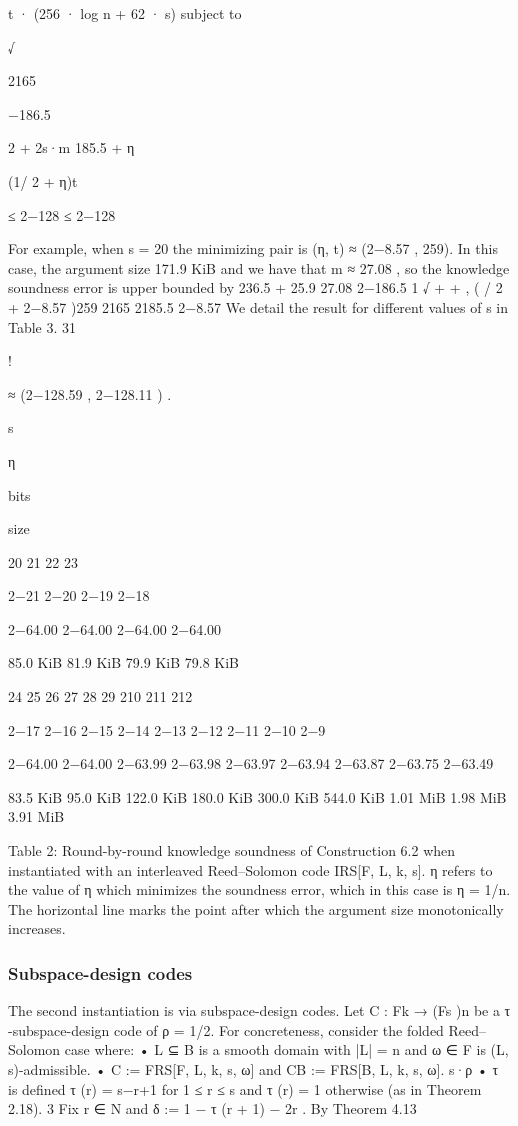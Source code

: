 \documentclass[11pt]{article}
\begin{document}
t · (256 · log n + 62 · s) subject to

√

2165

−186.5

2
+ 2s·m
185.5 +
η

(1/ 2 + η)t

≤ 2−128
≤ 2−128

For example, when s = 20 the minimizing pair is (η, t) ≈ (2−8.57 , 259). In this case, the argument
size 171.9 KiB and we have that m ≈ 27.08 , so the knowledge soundness error is upper bounded by
236.5 + 25.9
27.08
2−186.5 1 √
+
+
, ( / 2 + 2−8.57 )259
2165
2185.5
2−8.57
We detail the result for different values of s in Table 3.
31

!

≈ (2−128.59 , 2−128.11 ) .

s

η

bits

size

20
21
22
23

2−21
2−20
2−19
2−18

2−64.00
2−64.00
2−64.00
2−64.00

85.0 KiB
81.9 KiB
79.9 KiB
79.8 KiB

24
25
26
27
28
29
210
211
212

2−17
2−16
2−15
2−14
2−13
2−12
2−11
2−10
2−9

2−64.00
2−64.00
2−63.99
2−63.98
2−63.97
2−63.94
2−63.87
2−63.75
2−63.49

83.5 KiB
95.0 KiB
122.0 KiB
180.0 KiB
300.0 KiB
544.0 KiB
1.01 MiB
1.98 MiB
3.91 MiB

Table 2: Round-by-round knowledge soundness of Construction 6.2 when instantiated with an interleaved Reed–Solomon code IRS[F, L, k, s]. η refers to the value of η which minimizes the soundness
error, which in this case is η = 1/n. The horizontal line marks the point after which the argument size
monotonically increases.


\subsubsection{Subspace-design codes}



The second instantiation is via subspace-design codes. Let C : Fk → (Fs )n be a τ -subspace-design
code of ρ = 1/2. For concreteness, consider the folded Reed–Solomon case where:
• L ⊆ B is a smooth domain with |L| = n and ω ∈ F is (L, s)-admissible.
• C := FRS[F, L, k, s, ω] and CB := FRS[B, L, k, s, ω].
s·ρ
• τ is defined τ (r) = s−r+1
for 1 ≤ r ≤ s and τ (r) = 1 otherwise (as in Theorem 2.18).
3
Fix r ∈ N and δ := 1 − τ (r + 1) − 2r
. By Theorem 4.13
\end{document}
